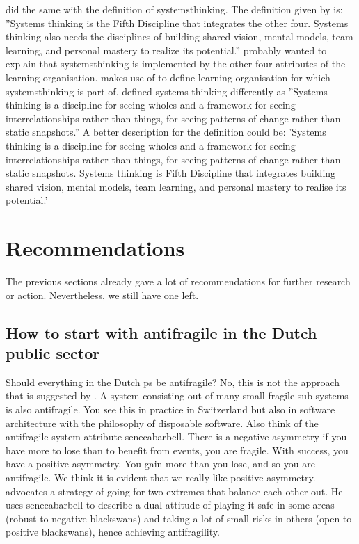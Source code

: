 \Textcite{Botjes2021} did the same with the definition of \gls{systemsthinking}. The definition given by \textcite{Botjes2021} is: ''Systems thinking is the Fifth Discipline that integrates the other four. Systems thinking also needs the disciplines of building shared vision, mental models, team learning, and personal mastery to realize its potential.'' \textcite{Botjes2021} probably wanted to explain that \gls{systemsthinking} is implemented by the other four \glspl{attribute} of the learning organisation.  \textcite{Botjes2021} makes use of \textcite{Senge1994} to define learning organisation for which \gls{systemsthinking} is part of. \textcite{Senge1994} defined systems thinking differently as ''Systems thinking is a discipline for seeing wholes and a framework for seeing interrelationships rather than things, for seeing patterns of change rather than static snapshots.'' A better description for the definition could be: 'Systems thinking is a discipline for seeing wholes and a framework for seeing interrelationships rather than things, for seeing patterns of change rather than static snapshots. Systems thinking is \textcite{Senge1994} Fifth Discipline that integrates building shared vision, mental models, team learning, and personal mastery to realise its potential.'

\section{Recommendations}
\label{sec:reccomandations}
The previous sections already gave a lot of recommendations for further research or action. Nevertheless, we still have one left.

\subsection{How to start with antifragile in the Dutch public sector}
\label{sub:howtostart}
Should everything in the Dutch \gls{ps} be \gls{antifragile}? No, this is not the approach that is suggested by \textcite{Taleb2012}. A system consisting out of many small \gls{fragile} sub-systems is also \gls{antifragile}. You see this in practice in Switzerland but also in software architecture with the philosophy of disposable software. Also think of the \gls{antifragile} system \gls{attribute} \gls{senecabarbell}. There is a negative asymmetry if you have more to lose than to benefit from events, you are fragile. With success, you have a positive asymmetry. You gain more than you lose, and so you are \gls{antifragile}. We think it is evident that we really like positive asymmetry. \textcite{Taleb2012} advocates a strategy of going for two extremes that balance each other out. He uses \gls{senecabarbell} to describe a dual attitude of playing it safe in some areas (robust to negative \glspl{blackswan}) and taking a lot of small risks in others (open to positive \glspl{blackswan}), hence achieving \gls{antifragility}.

